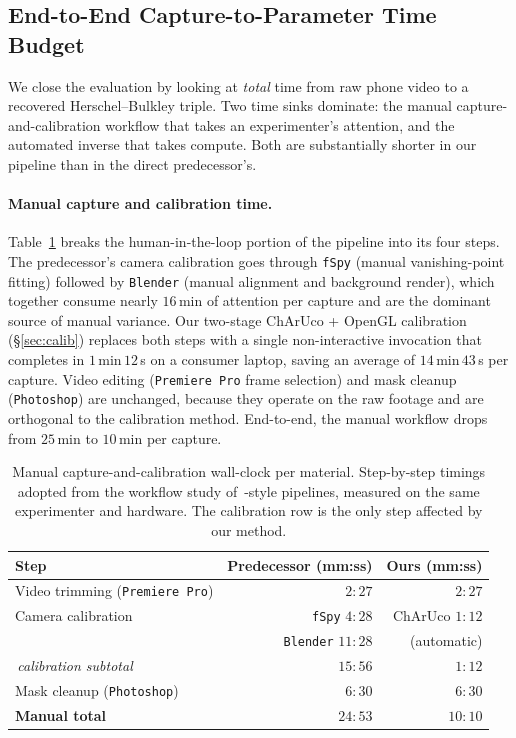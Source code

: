 \subsection{End-to-End Capture-to-Parameter Time Budget}
\label{sec:timebudget}

We close the evaluation by looking at \emph{total} time from raw
phone video to a recovered Herschel--Bulkley triple. Two time sinks
dominate: the manual capture-and-calibration workflow that takes an
experimenter's attention, and the automated inverse that takes
compute. Both are substantially shorter in our pipeline than in the
direct predecessor's.

\paragraph{Manual capture and calibration time.}
Table~\ref{tab:calib-time} breaks the human-in-the-loop portion of
the pipeline into its four steps. The predecessor's camera
calibration goes through \texttt{fSpy} (manual vanishing-point
fitting) followed by \texttt{Blender} (manual alignment and
background render), which together consume nearly $16$\,min of
attention per capture and are the dominant source of manual
variance. Our two-stage ChArUco + OpenGL calibration
(\S\ref{sec:calib}) replaces both steps with a single non-interactive
invocation that completes in $1$\,min\,$12$\,s on a consumer laptop,
saving an average of $14$\,min\,$43$\,s per capture. Video editing
(\texttt{Premiere Pro} frame selection) and mask cleanup
(\texttt{Photoshop}) are unchanged, because they operate on the raw
footage and are orthogonal to the calibration method. End-to-end,
the manual workflow drops from $25$\,min to $10$\,min per capture.

\begin{table}[!htbp]
\centering
\small
\caption{Manual capture-and-calibration wall-clock per material.
Step-by-step timings adopted from the workflow study
of~\cite{hamamichi2023nonnewtonian}-style pipelines, measured on the
same experimenter and hardware. The calibration row is the
only step affected by our method.}
\label{tab:calib-time}
\begin{tabular}{@{}lrr@{}}
\toprule
Step & Predecessor (mm:ss) & Ours (mm:ss) \\
\midrule
Video trimming (\texttt{Premiere Pro})
  & $2{:}27$ & $2{:}27$ \\
Camera calibration
  & \texttt{fSpy}  $4{:}28$ & ChArUco $1{:}12$ \\
  & \texttt{Blender} $11{:}28$ & (automatic)  \\
\,\quad \textit{calibration subtotal}
  & \textbf{$15{:}56$} & \textbf{$1{:}12$} \\
Mask cleanup (\texttt{Photoshop})
  & $6{:}30$ & $6{:}30$ \\
\midrule
\textbf{Manual total} & \textbf{$24{:}53$} & \textbf{$10{:}10$} \\
\bottomrule
\end{tabular}
\end{table}

